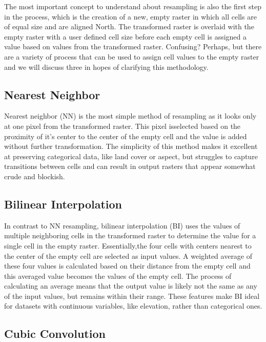 \documentclass[
]{book}
\begin{document}
The most important concept to understand about resampling is also the first step in the process, which is the creation of a new, empty raster in which all cells are of equal size and are aligned North. The transformed raster is overlaid with the empty raster with a user defined cell size before each empty cell is assigned a value based on values from the transformed raster. Confusing? Perhaps, but there are a variety of process that can be used to assign cell values to the empty raster and we will discuss three in hopes of clarifying this methodology.

\subsection{Nearest Neighbor}\label{nearest-neighbor}

Nearest neighbor (NN) is the most simple method of resampling as it looks only at one pixel from the transformed raster. This pixel isselected based on the proximity of it's center to the center of the empty cell and the value is added without further transformation. The simplicity of this method makes it excellent at preserving categorical data, like land cover or aspect, but struggles to capture transitions between cells and can result in output rasters that appear somewhat crude and blockish.

\subsection{Bilinear Interpolation}\label{bilinear-interpolation}

In contrast to NN resampling, bilinear interpolation (BI) uses the values of multiple neighboring cells in the transformed raster to determine the value for a single cell in the empty raster. Essentially,the four cells with centers nearest to the center of the empty cell are selected as input values. A weighted average of these four values is calculated based on their distance from the empty cell and this averaged value becomes the values of the empty cell. The process of calculating an average means that the output value is likely not the same as any of the input values, but remains within their range. These features make BI ideal for datasets with continuous variables, like elevation, rather than categorical ones.

\subsection{Cubic Convolution}\label{cubic-convolution}
\end{document}
